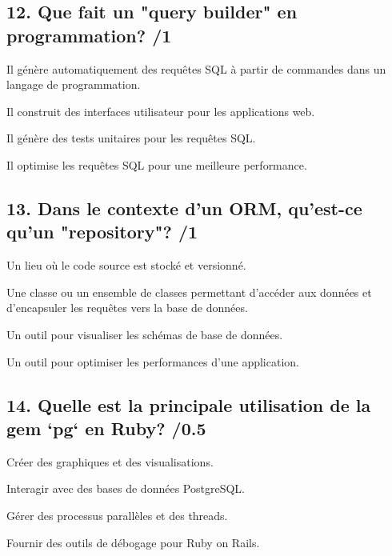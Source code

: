\documentclass[12pt,a4paper]{article}
\begin{document}
\begin{flushleft}
\subsection*{12. Que fait un "query builder" en programmation? /1}
\begin{choices}
    \item Il génère automatiquement des requêtes SQL à partir de commandes dans un langage de programmation.
    \item Il construit des interfaces utilisateur pour les applications web.
    \item Il génère des tests unitaires pour les requêtes SQL.
    \item Il optimise les requêtes SQL pour une meilleure performance.
\end{choices}

\subsection*{13. Dans le contexte d'un ORM, qu'est-ce qu'un "repository"? /1}
\begin{choices}
    \item Un lieu où le code source est stocké et versionné.
    \item Une classe ou un ensemble de classes permettant d'accéder aux données et d'encapsuler les requêtes vers la base de données.
    \item Un outil pour visualiser les schémas de base de données.
    \item Un outil pour optimiser les performances d'une application.
\end{choices}

\subsection*{14. Quelle est la principale utilisation de la gem `pg` en Ruby? /0.5}
\begin{choices}
    \item Créer des graphiques et des visualisations.
    \item Interagir avec des bases de données PostgreSQL.
    \item Gérer des processus parallèles et des threads.
    \item Fournir des outils de débogage pour Ruby on Rails.
\end{choices}


\end{flushleft}
\end{document}
